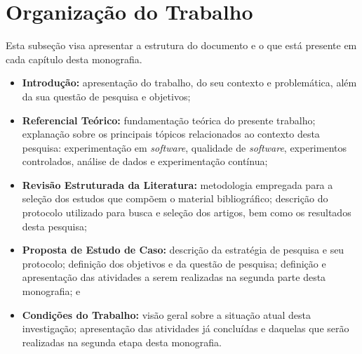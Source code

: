 \section{Organização do Trabalho}
\label{sec:organizacao}

Esta subseção visa apresentar a estrutura do documento e o que está presente em cada capítulo desta monografia.

\begin{itemize}
    \item \textbf{Introdução:} apresentação do trabalho, do seu contexto e problemática, além da sua questão de pesquisa e objetivos;
    \item \textbf{Referencial Teórico:} fundamentação teórica do presente trabalho; explanação sobre os principais tópicos relacionados ao contexto desta pesquisa: experimentação em \textit{software}, qualidade de \textit{software}, experimentos controlados, análise de dados e experimentação contínua;
    \item \textbf{Revisão Estruturada da Literatura:} metodologia empregada para a seleção dos estudos que compõem o material bibliográfico; descrição do protocolo utilizado para busca e seleção dos artigos, bem como os resultados desta pesquisa;
    \item \textbf{Proposta de Estudo de Caso:} descrição da estratégia de pesquisa e seu protocolo; definição dos objetivos e da questão de pesquisa; definição e apresentação das atividades a serem realizadas na segunda parte desta monografia; e
    \item \textbf{Condições do Trabalho:} visão geral sobre a situação atual desta investigação; apresentação das atividades já concluídas e daquelas que serão realizadas na segunda etapa desta monografia.
\end{itemize}
